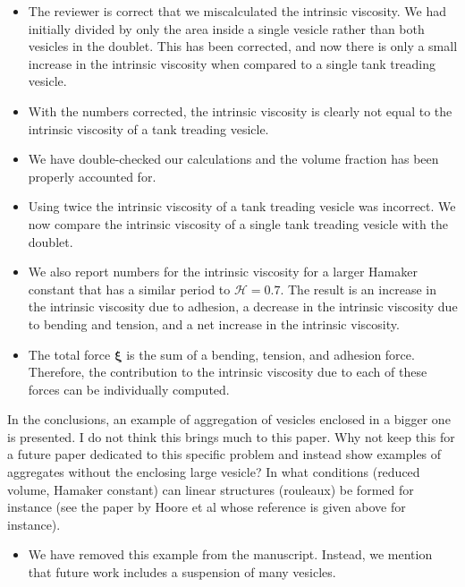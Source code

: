 \documentclass[11pt]{article}
\newcommand{\comment}[1]{{\color{blue} #1}}
\newcommand{\xxi}{\boldsymbol{\xi}}
\begin{document}
\begin{itemize}
  \item The reviewer is correct that we miscalculated the intrinsic
    viscosity.  We had initially divided by only the area inside a
    single vesicle rather than both vesicles in the doublet.  This has
    been corrected, and now there is only a small increase in the
    intrinsic viscosity when compared to a single tank treading vesicle.

  \item With the numbers corrected, the intrinsic viscosity is clearly
    not equal to the intrinsic viscosity of a tank treading vesicle.

  \item We have double-checked our calculations and the volume fraction
    has been properly accounted for.

  \item Using twice the intrinsic viscosity of a tank treading vesicle
    was incorrect.  We now compare the intrinsic viscosity of a single
    tank treading vesicle with the doublet.

  \item We also report numbers for the intrinsic viscosity for a larger
    Hamaker constant that has a similar period to $\mathcal{H} = 0.7$.
    The result is an increase in the intrinsic viscosity due to
    adhesion, a decrease in the intrinsic viscosity due to bending and
    tension, and a net increase in the intrinsic viscosity.

  \item The total force $\xxi$ is the sum of a bending, tension, and
    adhesion force.  Therefore, the contribution to the intrinsic
    viscosity due to each of these forces can be individually computed.
\end{itemize}

\noindent
\comment{In the conclusions, an example of aggregation of vesicles enclosed
in a bigger one is presented. I do not think this brings much to this
paper. Why not keep this for a future paper dedicated to this specific
problem and instead show examples of aggregates without the enclosing
large vesicle? In what conditions (reduced volume, Hamaker constant)
can linear structures (rouleaux) be formed for instance (see the paper
by Hoore et al whose reference is given above for instance).}
\begin{itemize}
  \item We have removed this example from the manuscript.  Instead, we
    mention that future work includes a suspension of many vesicles.
\end{itemize}
\end{document}
